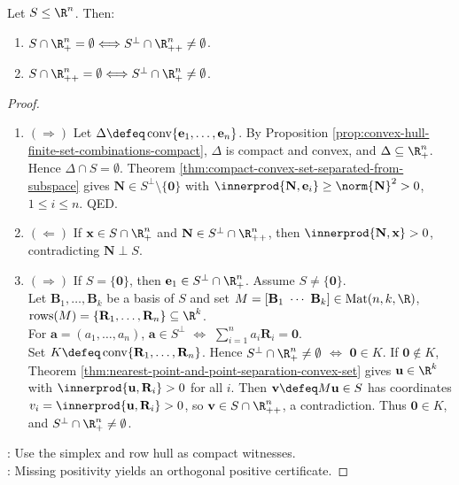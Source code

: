 \begin{theorem} \label{thm:positive-subspace-alternatives} \\
Let $S\leq\R^n$. Then:
\begin{enumerate}[label=(\roman*)]
\setlength{\itemsep}{0pt}
\item $S\cap\R_+^n=\emptyset \Longleftrightarrow S^\perp\cap\R_{++}^n\neq\emptyset$.
\item $S\cap\R_{++}^n=\emptyset \Longleftrightarrow S^\perp\cap\R_+^n\neq\emptyset$.
\end{enumerate}
\begin{proof}
\begin{enumerate}[label=(\roman*)]
\setlength{\itemsep}{0pt}
\item[$(i)$]$(\Rightarrow)$ Let $\Delta\defeq\operatorname{conv}\{\mathbf{e}_1,\ldots,\mathbf{e}_n\}$. By Proposition \ref{prop:convex-hull-finite-set-combinations-compact}, $\Delta$ is compact and convex, and $\Delta\subseteq\R_+^n$.\\
Hence $\Delta\cap S=\emptyset$. Theorem \ref{thm:compact-convex-set-separated-from-subspace} gives $\mathbf{N}\in S^\perp\setminus\{\mathbf{0}\}$ with $\innerprod{\mathbf{N},\mathbf{e}_i}\geq\norm{\mathbf{N}}^2>0$, $1\leq i\leq n$. QED.
\item[$(i)$]$(\Leftarrow)$ If $\mathbf{x}\in S\cap\R_+^n$ and $\mathbf{N}\in S^\perp\cap\R_{++}^n$, then $\innerprod{\mathbf{N},\mathbf{x}}>0$, contradicting $\mathbf{N}\perp S$.
\item[$(ii)$]$(\Rightarrow)$ If $S=\{\mathbf{0}\}$, then $\mathbf{e}_1\in S^\perp\cap\R_+^n$. Assume $S\neq\{\mathbf{0}\}$.\\
Let $\mathbf{B}_1,\ldots,\mathbf{B}_k$ be a basis of $S$ and set $M=[\mathbf{B}_1\ \cdots\ \mathbf{B}_k]\in\operatorname{Mat}(n,k,\R)$, $\operatorname{rows}(M)=\{\mathbf{R}_1,\ldots,\mathbf{R}_n\}\subseteq\R^k$.\\
For $\mathbf{a}=(a_1,\ldots,a_n)$, $\mathbf{a}\in S^\perp$ $\Longleftrightarrow$ $\sum\limits_{i=1}^n a_i\mathbf{R}_i=\mathbf{0}$.\\
Set $K\defeq\operatorname{conv}\{\mathbf{R}_1,\ldots,\mathbf{R}_n\}$. Hence $S^\perp\cap\R_+^n\neq\emptyset$ $\Longleftrightarrow$ $\mathbf{0}\in K$.
If $\mathbf{0}\notin K$, Theorem \ref{thm:nearest-point-and-point-separation-convex-set} gives $\mathbf{u}\in\R^k$ with $\innerprod{\mathbf{u},\mathbf{R}_i}>0$ for all $i$. Then $\mathbf{v}\defeq M\mathbf{u}\in S$ has coordinates $v_i=\innerprod{\mathbf{u},\mathbf{R}_i}>0$, so $\mathbf{v}\in S\cap\R_{++}^n$, a contradiction. Thus $\mathbf{0}\in K$, and $S^\perp\cap\R_+^n\neq\emptyset$.
\end{enumerate}
: Use the simplex and row hull as compact witnesses.\\
: Missing positivity yields an orthogonal positive certificate.
\end{proof}
\end{theorem}

